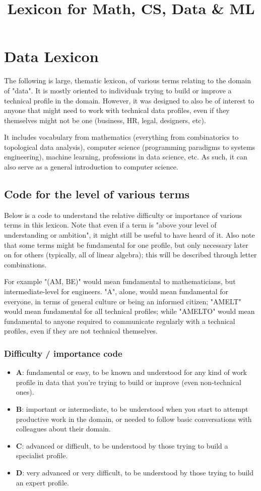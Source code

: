 \documentclass{article}
\title{Lexicon for Math, CS, Data & ML}
\begin{document}
\section*{Data Lexicon}

The following is large, thematic lexicon, of various terms relating to the domain of "data". It is mostly oriented to individuals trying to build or improve a technical profile in the domain. However, it was designed to also be of interest to anyone that might need to work with technical data profiles, even if they themselves might not be one (business, HR, legal, designers, etc).

It includes vocabulary from mathematics (everything from combinatorics to topological data analysis), computer science (programming paradigms to systems engineering), machine learning, professions in data science, etc. As such, it can also serve as a general introduction to computer science.




\subsection*{Code for the level of various terms}

Below is a code to understand the relative difficulty or importance of various terms in this lexicon. Note that even if a term is "above your level of understanding or ambition", it might still be useful to have heard of it. Also note that some terms might be fundamental for one profile, but only necessary later on for others (typically, all of linear algebra); this will be described through letter combinations.

For example "(AM, BE)" would mean fundamental to mathematicians, but intermediate-level for engineers. "A", alone, would mean fundamental for everyone, in terms of general culture or being an informed citizen; "AMELT" would mean fundamental for all technical profiles; while "AMELTO" would mean fundamental to anyone required to communicate regularly with a technical profiles, even if they are not technical themselves.


\subsubsection*{Difficulty / importance code}

\begin{itemize}
	\item \textbf{A}: fundamental or easy, to be known and understood for any kind of work profile in data that you're trying to build or improve (even non-technical ones).
	\item \textbf{B}: important or intermediate, to be understood when you start to attempt productive work in the domain, or needed to follow basic conversations with colleagues about their domain.
	\item \textbf{C}: advanced or difficult, to be understood by those trying to build a specialist profile.
	\item \textbf{D}: very advanced or very difficult, to be understood by those trying to build an expert profile.
\end{itemize}
\end{document}
